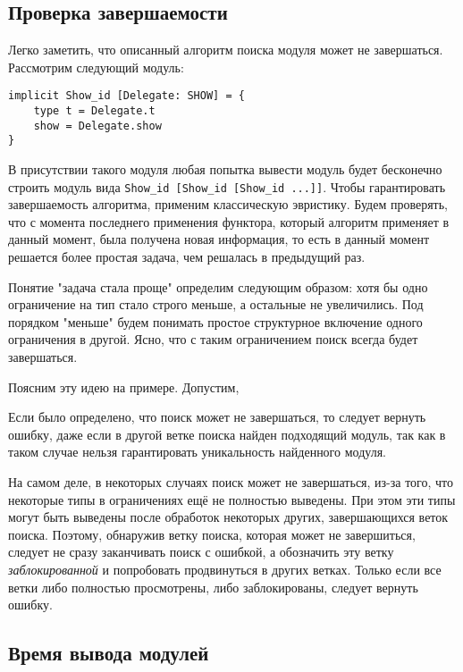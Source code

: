 \documentclass[../diploma.tex]{subfiles}
\begin{document}
\label{sec:2}

\subsection{Проверка завершаемости}\label{termination}

Легко заметить, что описанный алгоритм поиска модуля может не завершаться. Рассмотрим следующий модуль:

\begin{verbatim}
implicit Show_id [Delegate: SHOW] = {
    type t = Delegate.t
    show = Delegate.show
}
\end{verbatim}

В присутствии такого модуля любая попытка вывести модуль будет бесконечно строить модуль вида \texttt{Show_id [Show_id [Show_id ...]]}. Чтобы гарантировать завершаемость алгоритма, применим классическую эвристику. Будем проверять, что с момента последнего применения функтора, который алгоритм применяет в данный момент, была получена новая информация, то есть в данный момент решается более простая задача, чем решалась в предыдущий раз.

Понятие "задача стала проще" определим следующим образом: хотя бы одно ограничение на тип стало строго меньше, а остальные не увеличились. Под порядком "меньше" будем понимать простое структурное включение одного ограничения в другой. Ясно, что с таким ограничением поиск всегда будет завершаться.

Поясним эту идею на примере. Допустим, 

Если было определено, что поиск может не завершаться, то следует вернуть ошибку, даже если в другой ветке поиска найден подходящий модуль, так как в таком случае нельзя гарантировать уникальность найденного модуля.

На самом деле, в некоторых случаях поиск может не завершаться, из-за того, что некоторые типы в ограничениях ещё не полностью выведены. При этом эти типы могут быть выведены после обработок некоторых других, завершающихся веток поиска. Поэтому, обнаружив ветку поиска, которая может не завершиться, следует не сразу заканчивать поиск с ошибкой, а обозначить эту ветку \textit{заблокированной} и попробовать продвинуться в других ветках. Только если все ветки либо полностью просмотрены, либо заблокированы, следует вернуть ошибку.

\subsection{Время вывода модулей}\label{time}
\end{document}
